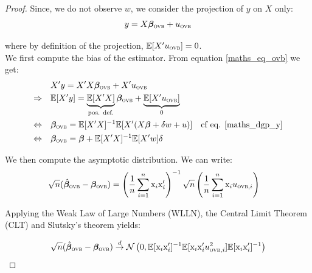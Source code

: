 \documentclass[usletter, 12pt]{article}
\begin{document}
			\begin{proof} 
				Since, we do not observe $w$, we consider the projection of $y$ on $X$ only:
						~
						\begin{equation}\label{maths_eq_ovb}
							y = X\bm{\beta}_{\textsc{ovb}} + u_{\textsc{ovb}}
						\end{equation}
				
						where by definition of the projection, $\mathbb{E}[X'u_{\textsc{ovb}}] = 0$.\\
				
				We first compute the bias of the estimator. From equation  \ref{maths_eq_ovb} we get: 
				~
				\begin{equation}\label{bias_ovb}
					\begin{aligned}
            					& X'y = X'X\bm{\beta}_{\textsc{ovb}} + X'u_{\textsc{ovb}}\\
            					\Rightarrow \quad & \mathbb{E}[X'y] = \underbrace{\mathbb{E}[X'X]}_{\text{pos. def.}}\bm{\beta}_{\textsc{ovb}} + \underbrace{\mathbb{E}[X'u_{\textsc{ovb}}]}_{0} \\
            					\Leftrightarrow \quad & \bm{\beta}_{\textsc{ovb}} = \mathbb{E}[X'X]^{-1} \mathbb{E}[X'(X\bm{\beta} + \delta w + u)] & \text{cf eq. \ref{maths_dgp_y}}\\
            					\Leftrightarrow \quad & \bm{\beta}_{\textsc{ovb}} = \bm{\beta} + \mathbb{E}[X'X]^{-1} \mathbb{E}[X'w] \delta
					\end{aligned}
				\end{equation}		
				
				We then compute the asymptotic distribution. We can write: 
				~
				\begin{align*}
					\sqrt{n}(\hat{\bm{\beta}}_{\textsc{ovb}} - \bm{\beta}_{\textsc{ovb}}) &  = \left(\dfrac{1}{n} \sum_{i = 1}^{n} \text{x}_{i} \text{x}_{i}' \right)^{-1} \sqrt{n} \left(\dfrac{1}{n} \sum_{i = 1}^{n} \text{x}_{i} u_{\textsc{ovb}, i} \right)
				\end{align*}	
				
				Applying the Weak Law of Large Numbers (WLLN), the Central Limit Theorem (CLT) and Slutsky's theorem yields:
				
				\begin{equation}\label{asympt_ovb}
					\sqrt{n}(\hat{\bm{\beta}}_{\textsc{ovb}} - \bm{\beta}_{\textsc{ovb}}) \overset{d}{\to} \mathcal{N}\left(0,  \mathbb{E}[\text{x}_{i}\text{x}_{i}']^{-1} \mathbb{E}[\text{x}_{i}\text{x}_{i}'u_{\textsc{ovb}, i}^{2}] \mathbb{E}[\text{x}_{i}\text{x}_{i}']^{-1}\right) 
				\end{equation}
				

\end{proof}
\end{document}
